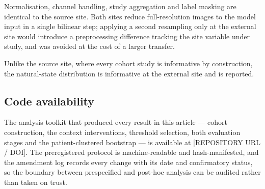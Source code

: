 Normalisation, channel handling, study aggregation and label masking are
identical to the source site. Both sites reduce full-resolution images to the
model input in a single bilinear step; applying a second resampling only at the
external site would introduce a preprocessing difference tracking the site
variable under study, and was avoided at the cost of a larger transfer.

Unlike the source site, where every cohort study is informative by construction,
the natural-state distribution is informative at the external site and is
reported.

\subsection*{Code availability}

The analysis toolkit that produced every result in this article --- cohort
construction, the context interventions, threshold selection, both evaluation
stages and the patient-clustered bootstrap --- is available at [REPOSITORY URL
/ DOI]. The preregistered protocol is machine-readable and hash-manifested, and
the amendment log records every change with its date and confirmatory status,
so the boundary between prespecified and post-hoc analysis can be audited
rather than taken on trust.
